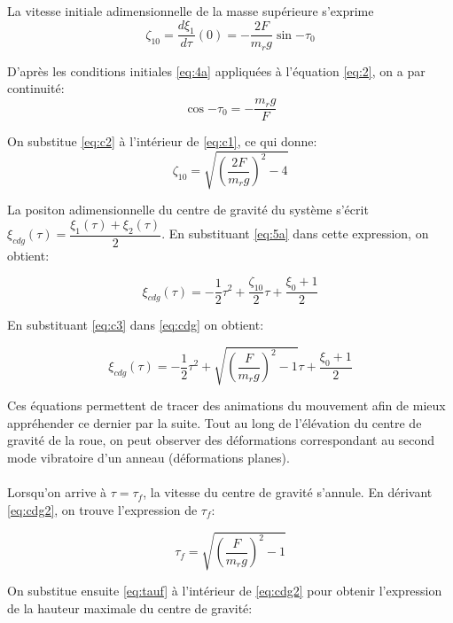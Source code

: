 La vitesse initiale adimensionnelle de la masse supérieure s'exprime
\begin{equation}
    \zeta_{10}=\frac{d\xi_1}{d\tau}(0)=-\frac{2F}{m_r g}\sin{-\tau_0}
    \label{eq:c1}
\end{equation}


D'après les conditions initiales \ref{eq:4a} appliquées à l'équation \ref{eq:2}, on a par continuité:
\begin{equation}
    \cos{-\tau_0}=-\frac{m_r g}{F}
    \label{eq:c2}
\end{equation}

On substitue \ref{eq:c2} à l'intérieur de \ref{eq:c1}, ce qui donne:
\begin{equation}
    \zeta_{10}=\sqrt{(\frac{2F}{m_r g})^2-4}
    \label{eq:c3}
\end{equation}

La positon adimensionnelle du centre de gravité du système s'écrit $\xi_{cdg}(\tau)=\dfrac{\xi_1(\tau)+\xi_2(\tau)}{2}$. En substituant \ref{eq:5a} dans cette expression, on obtient: 

\begin{equation}
  \xi_{cdg}(\tau)=-\frac{1}{2}\tau^2+\frac{\zeta_{10}}{2}\tau+\frac{\xi_0+1}{2}
  \label{eq:cdg}
\end{equation}

En substituant \ref{eq:c3} dans \ref{eq:cdg} on obtient:

\begin{equation}
  \xi_{cdg}(\tau)=-\frac{1}{2}\tau^2+\sqrt{(\frac{F}{m_r g})^2-1}\tau+\frac{\xi_0+1}{2}
  \label{eq:cdg2}
\end{equation}



Ces équations permettent de tracer des animations du mouvement afin de mieux appréhender ce dernier par la suite. Tout au long de l'élévation du centre de gravité de la roue, on peut observer des déformations correspondant au second mode vibratoire d'un anneau (déformations planes).
\\ 
\\


Lorsqu'on arrive à $\tau=\tau_f$, la vitesse du centre de gravité s'annule. En dérivant \ref{eq:cdg2}, on trouve l'expression de $\tau_f$:

\begin{equation}
    \tau_f=\sqrt{(\frac{F}{m_r g})^2-1}
    \label{eq:tauf}
\end{equation}

On substitue ensuite \ref{eq:tauf} à l'intérieur de \ref{eq:cdg2} pour obtenir l'expression de la hauteur maximale du centre de gravité:

